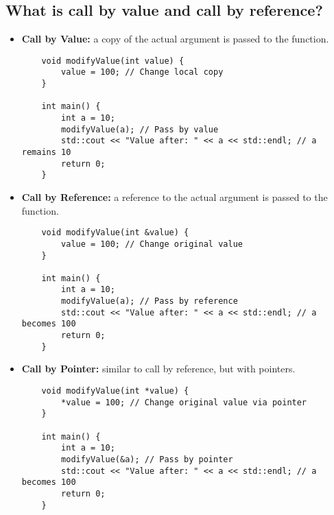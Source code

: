\subsection{What is call by value and call by reference?}
\begin{itemize}
    \item \textbf{Call by Value:} a copy of the actual argument is passed to the function.
    \begin{tcolorbox}[title=Call by Value]
    \begin{verbatim}
    void modifyValue(int value) {
        value = 100; // Change local copy
    }
    
    int main() {
        int a = 10;
        modifyValue(a); // Pass by value
        std::cout << "Value after: " << a << std::endl; // a remains 10
        return 0;
    }
    \end{verbatim}
    \end{tcolorbox}
    \item \textbf{Call by Reference:} a reference to the actual argument is passed to the function.
    \begin{tcolorbox}[title=Call by Reference]
    \begin{verbatim}
    void modifyValue(int &value) {
        value = 100; // Change original value
    }

    int main() {
        int a = 10;
        modifyValue(a); // Pass by reference
        std::cout << "Value after: " << a << std::endl; // a becomes 100
        return 0;
    }
    \end{verbatim}
    \end{tcolorbox}
    \item \textbf{Call by Pointer:} similar to call by reference, but with pointers.
    \begin{tcolorbox}[title=Call by Pointer]
    \begin{verbatim}
    void modifyValue(int *value) {
        *value = 100; // Change original value via pointer
    }

    int main() {
        int a = 10;
        modifyValue(&a); // Pass by pointer
        std::cout << "Value after: " << a << std::endl; // a becomes 100
        return 0;
    }
    \end{verbatim}
    \end{tcolorbox}
\end{itemize}


